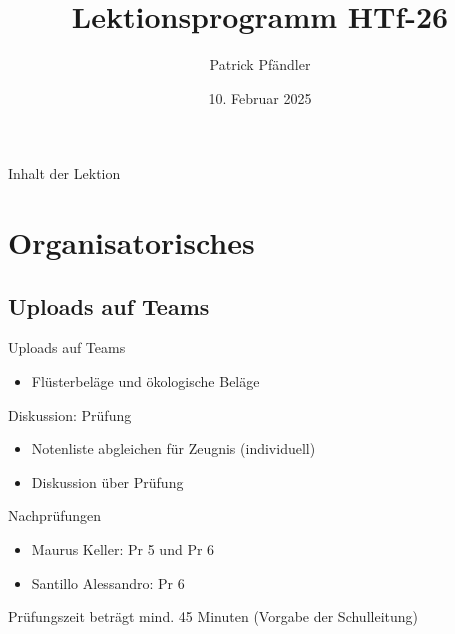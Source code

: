 \def\customoptions{aspectratio=169} %



\title{\textbf{Lektionsprogramm HTf-26}}
\author{Patrick Pfändler}
\date{10. Februar 2025}




\frame{\titlepage}

\begin{frame}{Inhalt der Lektion}
    \tableofcontents
\end{frame}


\section{Organisatorisches}
\BlueSectionSlide

\subsection{Uploads auf Teams}
\begin{frame}{Uploads auf Teams}
    \begin{itemize}
        \item[\textbullet] Flüsterbeläge und ökologische Beläge
    \end{itemize}

\end{frame}

\begin{frame}{Diskussion: Prüfung}
    \begin{itemize}
        \item[\textbullet] Notenliste abgleichen für Zeugnis (individuell)
        \item[\textbullet] Diskussion über Prüfung
    \end{itemize}
    \end{frame}

\begin{frame}{Nachprüfungen}
    \begin{itemize}
        \item Maurus Keller: Pr 5 und Pr 6 
        \item Santillo	Alessandro: Pr 6
    \end{itemize}

    \vspace{\baselineskip}
    Prüfungszeit beträgt mind. 45 Minuten (Vorgabe der Schulleitung)

\end{frame}


